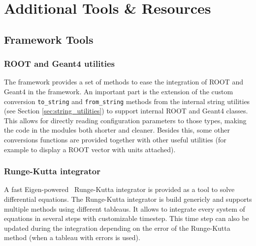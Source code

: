 \section{Additional Tools \& Resources}
\label{sec:additional_tools_resources}

\subsection{Framework Tools}
\subsubsection{ROOT and Geant4 utilities}
\label{sec:root_and_geant4_utilities}
The framework provides a set of methods to ease the integration of ROOT and Geant4 in the framework. An important part is the extension of the custom conversion \texttt{to\_string} and \texttt{from\_string} methods from the internal string utilities (see Section \ref{sec:string_utilities}) to support internal ROOT and Geant4 classes. This allows for directly reading configuration parameters to those types, making the code in the modules both shorter and cleaner. Besides this, some other conversions functions are provided together with other useful utilities (for example to display a ROOT vector with units attached).

\subsubsection{Runge-Kutta integrator}
A fast Eigen-powered~\cite{eigen3} Runge-Kutta integrator is provided as a tool to solve differential equations. The Runge-Kutta integrator is build genericly and supports multiple methods using different tableaus. It allows to integrate every system of equations in several steps with customizable timestep. This time step can also be updated during the integration depending on the error of the Runge-Kutta method (when a tableau with errors is used).

\label{sec:tcad_electric_field_converter}

\label{sec:root_analysis_macros}
